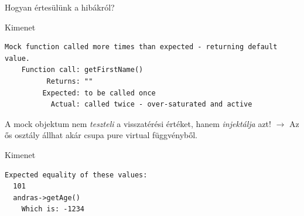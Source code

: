 \documentclass[usenames,dvipsnames,aspectratio=169]{beamer}
\begin{document}
\begin{frame}[fragile]
    Hogyan értesülünk a hibákról?
    \begin{exampleblock}{}
        \footnotesize
        
    \end{exampleblock}
    \begin{block}{Kimenet}
        \vspace{-.4cm}
        \small
        \begin{verbatim}
Mock function called more times than expected - returning default value.
    Function call: getFirstName()
          Returns: ""
         Expected: to be called once
           Actual: called twice - over-saturated and active    
\end{verbatim}
        \vspace{-.4cm}
    \end{block}
\end{frame}

\begin{frame}[fragile]
    A mock objektum nem \emph{teszteli} a visszatérési értéket, hanem \emph{injektálja} azt! $\to$ Az ős osztály állhat akár csupa pure virtual függvényből.
    \begin{exampleblock}{}
        \footnotesize
        
    \end{exampleblock}
    \begin{block}{Kimenet}
        \vspace{-.4cm}
        \small
        \begin{verbatim}
Expected equality of these values:
  101
  andras->getAge()
    Which is: -1234    
\end{verbatim}
        \vspace{-.4cm}
    \end{block}
\end{frame}
\end{document}
